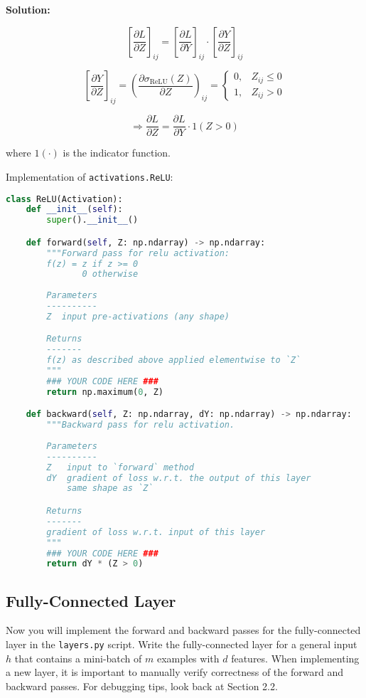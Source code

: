 \documentclass{article}
\newenvironment{solution}{\color{blue} \smallskip \textbf{Solution:}}{}
\begin{document}
\begin{solution}

\[
\left[ \frac{\partial L}{\partial Z} \right]_{ij} = \left[ \frac{\partial L}{\partial Y} \right]_{ij} \cdot \left[ \frac{\partial Y}{\partial Z} \right]_{ij}
\]

\[
\left[ \frac{\partial Y}{\partial Z} \right]_{ij} = \left( \frac{\partial \sigma_{\text{ReLU}}(Z)}{\partial Z} \right)_{ij} = 
\begin{cases}
0, & Z_{ij} \leq 0 \\
1, & Z_{ij} > 0
\end{cases}
\]

\[
\Rightarrow \frac{\partial L}{\partial Z} = \frac{\partial L}{\partial Y} \cdot 1(Z > 0)
\]

where \( 1(\cdot) \) is the indicator function.

    Implementation of \texttt{activations.ReLU}:

\begin{lstlisting}[language=Python]
class ReLU(Activation):
    def __init__(self):
        super().__init__()

    def forward(self, Z: np.ndarray) -> np.ndarray:
        """Forward pass for relu activation:
        f(z) = z if z >= 0
               0 otherwise
        
        Parameters
        ----------
        Z  input pre-activations (any shape)

        Returns
        -------
        f(z) as described above applied elementwise to `Z`
        """
        ### YOUR CODE HERE ###
        return np.maximum(0, Z)

    def backward(self, Z: np.ndarray, dY: np.ndarray) -> np.ndarray:
        """Backward pass for relu activation.
        
        Parameters
        ----------
        Z   input to `forward` method
        dY  gradient of loss w.r.t. the output of this layer
            same shape as `Z`

        Returns
        -------
        gradient of loss w.r.t. input of this layer
        """
        ### YOUR CODE HERE ###
        return dY * (Z > 0)

\end{lstlisting}

\end{solution}

\newpage
\subsection{Fully-Connected Layer}
Now you will implement the forward and backward passes for the fully-connected layer in the \texttt{layers.py} script. 
Write the fully-connected layer for a general input $h$ that contains a mini-batch of $m$ examples with $d$ features. 
When implementing a new layer, it is important to manually verify correctness of the forward and backward passes. For debugging tips, look back at Section 2.2.
\end{document}
